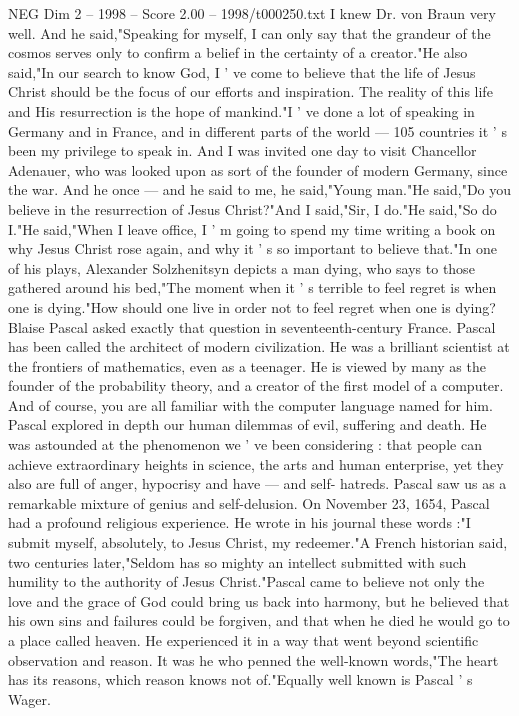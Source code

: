 \begin{textsample}{NEG Dim 2 – 1998 – Score 2.00 – 1998/t000250.txt}
I knew Dr. von Braun very well.
And he said,"Speaking for myself, I can only say that the grandeur of the cosmos serves only to confirm a belief in the certainty of a creator."He also said,"In our search to know God, I ' ve come to believe that the life of Jesus Christ should be the focus of our efforts and inspiration.
The reality of this life and His resurrection is the hope of mankind."I ' ve done a lot of speaking in Germany and in France, and in different parts of the world — 105 countries it ' s been my privilege to speak in.
And I was invited one day to visit Chancellor Adenauer, who was looked upon as sort of the founder of modern Germany, since the war.
And he once — and he said to me, he said,"Young man."He said,"Do you believe in the resurrection of Jesus Christ?"And I said,"Sir, I do."He said,"So do I."He said,"When I leave office, I ' m going to spend my time writing a book on why Jesus Christ rose again, and why it ' s so important to believe that."In one of his plays, Alexander Solzhenitsyn depicts a man dying, who says to those gathered around his bed,"The moment when it ' s terrible to feel regret is when one is dying."How should one live in order not to feel regret when one is dying?
Blaise Pascal asked exactly that question in seventeenth-century France.
Pascal has been called the architect of modern civilization.
He was a brilliant scientist at the frontiers of mathematics, even as a teenager.
He is viewed by many as the founder of the probability theory, and a creator of the first model of a computer.
And of course, you are all familiar with the computer language named for him.
Pascal explored in depth our human dilemmas of evil, suffering and death.
He was astounded at the phenomenon we ' ve been considering : that people can achieve extraordinary heights in science, the arts and human enterprise, yet they also are full of anger, hypocrisy and have — and self- hatreds.
Pascal saw us as a remarkable mixture of genius and self-delusion.
On November 23, 1654, Pascal had a profound religious experience.
He wrote in his journal these words :"I submit myself, absolutely, to Jesus Christ, my redeemer."A French historian said, two centuries later,"Seldom has so mighty an intellect submitted with such humility to the authority of Jesus Christ."Pascal came to believe not only the love and the grace of God could bring us back into harmony, but he believed that his own sins and failures could be forgiven, and that when he died he would go to a place called heaven.
He experienced it in a way that went beyond scientific observation and reason.
It was he who penned the well-known words,"The heart has its reasons, which reason knows not of."Equally well known is Pascal ' s Wager.

\end{textsample}
